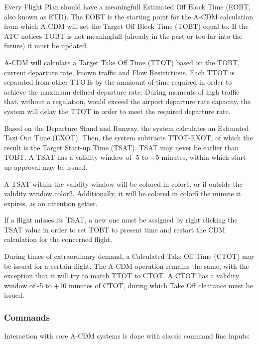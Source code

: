 \documentclass[a4paper,oneside,11pt]{memoir}
\newcommand{\colorref}[1]{\colorbox{Flight Highlight}{\color{#1}#1}}
\begin{document}
\medskip

Every Flight Plan should have a meaningfull Estimated Off Block Time (EOBT, also known as ETD). The EOBT is the starting point for the A-CDM calculation from which A-CDM will set the Target Off Block Time (TOBT) equal to. If the ATC notices TOBT is not meaningfull (already in the past or too far into the future) it must be updated.

\medskip

A-CDM will calculate a Target Take Off Time (TTOT) based on the TOBT, current departure rate, known traffic and Flow Restrictions. Each TTOT is separated from other TTOTs by the ammount of time required in order to achieve the maximum defined departure rate. During moments of high traffic that, without a regulation, would exceed the airport departure rate capacity, the system will delay the TTOT in order to meet the required departure rate. 

\medskip

Based on the Departure Stand and Runway, the system calculates an Estimated Taxi Out Time (EXOT). Then, the system subtracts TTOT-EXOT, of which the result is the Target Start-up Time (TSAT). TSAT may never be earlier than TOBT. A TSAT has a validity window of -5 to +5 minutes, within which start-up approval may be issued. 

A TSAT within the validity window will be colored in \colorref{color1}, or if outside the validity window \colorref{color2}. Additionally, it will be colored in \colorref{color5} the minute it expires, as an attention getter.

If a flight misses its TSAT, a new one must be assigned by right clicking the TSAT value in order to set TOBT to present time and restart the CDM calculation for the concerned flight.

\medskip

During times of extraordinary demand, a Calculated Take-Off Time (CTOT) may be issued for a certain flight. The A-CDM operation remains the same, with the exception that it will try to match TTOT to CTOT. A CTOT has a validity window of -5 to +10 minutes of CTOT, during which Take Off clearance must be issued.    

\subsubsection{Commands}

Interaction with core A-CDM systems is done with classic command line inputs:
\end{document}
